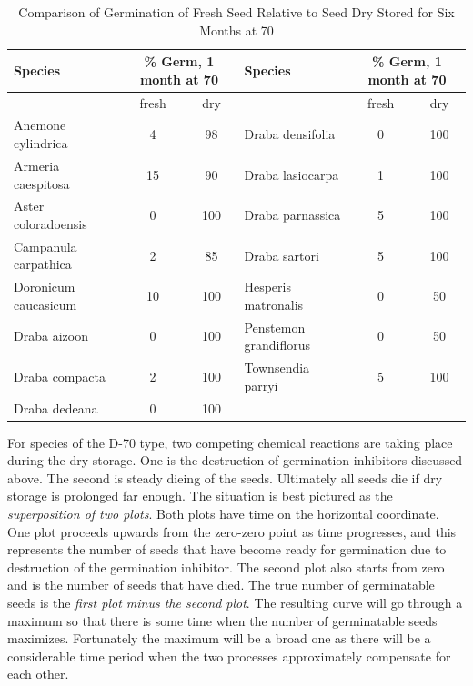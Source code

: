 \begin{table}[h!]
\centering

\begin{tabular}{|l|c|c|l|c|c|}
 \hline
 Species &
 \multicolumn{2}{|p{2cm}|}{\% Germ, 1 month at 70} &
 Species &
 \multicolumn{2}{|p{2cm}|}{\% Germ, 1 month at 70} \\
 \hline

 & fresh & dry & & fresh & dry \\

\hline
Anemone cylindrica & 4 & 98     & Draba densifolia & 0 & 100 \\
Armeria caespitosa & 15 & 90    & Draba lasiocarpa & 1 & 100 \\
Aster coloradoensis & 0 & 100   & Draba parnassica & 5 & 100 \\
Campanula carpathica & 2 & 85   & Draba sartori    & 5 & 100 \\
Doronicum caucasicum & 10 & 100 & Hesperis matronalis & 0 & 50 \\
Draba aizoon & 0 & 100          & Penstemon grandiflorus & 0 & 50 \\
Draba compacta & 2 & 100        & Townsendia parryi      & 5 & 100 \\
Draba dedeana & 0 & 100         & & & \\
\hline
\end{tabular}

\caption{Comparison of Germination of Fresh Seed Relative to Seed Dry Stored for Six Months at 70}
\label{table:fds}
\end{table}

For species of the D-70 type, two competing chemical reactions are taking place
during the dry storage. One is the destruction of germination inhibitors discussed
above. The second is steady dieing of the seeds. Ultimately all seeds die if dry
storage is prolonged far enough. The situation is best pictured as the \textit{superposition of
two plots}. Both plots have time on the horizontal coordinate. One plot proceeds
upwards from the zero-zero point as time progresses, and this represents the number
of seeds that have become ready for germination due to destruction of the germination
inhibitor. The second plot also starts from zero and is the number of seeds that have
died. The true number of germinatable seeds is the \textit{first plot minus the second plot}.
The resulting curve will go through a maximum so that there is some time when the
number of germinatable seeds maximizes. Fortunately the maximum will be a broad
one as there will be a considerable time period when the two processes approximately
compensate for each other.

